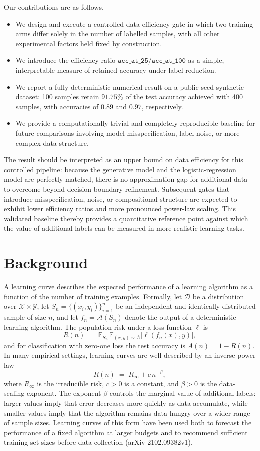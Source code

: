 \documentclass[10pt]{article}
\begin{document}
Our contributions are as follows.
\begin{itemize}
    \item We design and execute a controlled data-efficiency gate in which two training arms differ solely in the number of labelled samples, with all other experimental factors held fixed by construction.
    \item We introduce the efficiency ratio \(\texttt{acc\_at\_25}/\texttt{acc\_at\_100}\) as a simple, interpretable measure of retained accuracy under label reduction.
    \item We report a fully deterministic numerical result on a public-seed synthetic dataset: 100 samples retain \(91.75\%\) of the test accuracy achieved with 400 samples, with accuracies of \(0.89\) and \(0.97\), respectively.
    \item We provide a computationally trivial and completely reproducible baseline for future comparisons involving model misspecification, label noise, or more complex data structure.
\end{itemize}

The result should be interpreted as an upper bound on data efficiency for this controlled pipeline: because the generative model and the logistic-regression model are perfectly matched, there is no approximation gap for additional data to overcome beyond decision-boundary refinement. Subsequent gates that introduce misspecification, noise, or compositional structure are expected to exhibit lower efficiency ratios and more pronounced power-law scaling. This validated baseline thereby provides a quantitative reference point against which the value of additional labels can be measured in more realistic learning tasks.

\section{Background}
A learning curve describes the expected performance of a learning algorithm as a function of the number of training examples. Formally, let \(\mathcal{D}\) be a distribution over \(\mathcal{X} \times \mathcal{Y}\), let \(S_n = \{(x_i, y_i)\}_{i=1}^n\) be an independent and identically distributed sample of size \(n\), and let \(f_n = \mathcal{A}(S_n)\) denote the output of a deterministic learning algorithm. The population risk under a loss function \(\ell\) is
\[
R(n) \;=\; \mathbb{E}_{S_n}\,\mathbb{E}_{(x,y)\sim\mathcal{D}}\bigl[\ell(f_n(x), y)\bigr],
\]
and for classification with zero-one loss the test accuracy is \(A(n) = 1 - R(n)\). In many empirical settings, learning curves are well described by an inverse power law
\[
R(n) \;=\; R_\infty + c\, n^{-\beta},
\]
where \(R_\infty\) is the irreducible risk, \(c > 0\) is a constant, and \(\beta > 0\) is the data-scaling exponent. The exponent \(\beta\) controls the marginal value of additional labels: larger values imply that error decreases more quickly as data accumulate, while smaller values imply that the algorithm remains data-hungry over a wider range of sample sizes. Learning curves of this form have been used both to forecast the performance of a fixed algorithm at larger budgets and to recommend sufficient training-set sizes before data collection (arXiv 2102.09382v1).
\end{document}
